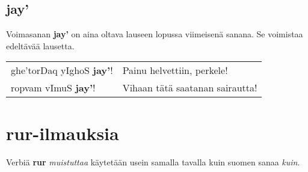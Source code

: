 \documentclass{book}
\begin{document}
\section{jay'}

Voimasanan \textbf{jay'} on aina oltava lauseen lopussa viimeisenä sanana. Se voimistaa edeltävää lausetta.

\begin{tabular}{l l}
    ghe'torDaq yIghoS \textbf{jay'}! & Painu helvettiin, perkele! \\
    ropvam vImuS \textbf{jay'}! & Vihaan tätä saatanan sairautta! \\
\end{tabular}

\chapter{rur-ilmauksia}

Verbiä \textbf{rur} \textit{muistuttaa} käytetään usein samalla tavalla kuin suomen sanaa \textit{kuin}.
\end{document}
